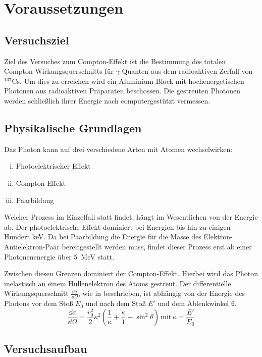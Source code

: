 \section{Voraussetzungen}

\subsection{Versuchsziel}

Ziel des Versuches zum Compton-Effekt ist die Bestimmung des totalen
Compton-Wirkungsquerschnitts für $\gamma$-Quanten aus dem radioaktiven
Zerfall von  $^{137}$Cs. Um dies zu erreichen wird ein
Aluminium-Block mit hochenergetischen Photonen aus radioaktiven Präparaten
beschossen. Die gestreuten Photonen werden schließlich ihrer Energie nach
computergestützt vermessen.

\subsection{Physikalische Grundlagen}

Das Photon kann auf drei verschiedene Arten mit Atomen wechselwirken:
\begin{enumerate}[i)]
  \item Photoelektrischer Effekt
  \item Compton-Effekt
  \item Paarbildung
\end{enumerate}
Welcher Prozess im Einzelfall statt findet, hängt im Wesentlichen von der
Energie ab. Der photoelektrische Effekt dominiert bei Energien bis hin zu
einigen Hundert \si{\kilo\eV}. Da bei Paarbildung die Energie für die Masse des
Elektron-Antielektron-Paar bereitgestellt werden muss, findet dieser Prozess
erst ab einer Photonenenergie über \SI{5}{\mega\eV} statt.

Zwischen diesen Grenzen dominiert der Compton-Effekt. Hierbei wird das Photon
inelastisch an einem Hüllenelektron des Atoms gestreut. Der differentielle
Wirkungsquerschnitt $\frac{\dd{σ}}{\dd{\Omega}}$, wie in \cite[Gl. 1]{script}
beschrieben, ist abhängig von der Energie des Photons vor dem Stoß $E_0$ und
nach dem Stoß $E'$ und dem Ablenkwinkel θ.
\begin{equation}
  \frac{\dd{σ}}{\dd{\Omega}} = \frac{r_0^2}{2}κ^2\left(\frac{1}{κ}+\frac{κ}{1}-\sin^2\theta\right)
  \,
  \mathrm{mit}
  \,
  κ = \frac{E'}{E_0}
  \label{eqn:diff_sigma}
\end{equation}

\subsection{Versuchsaufbau}

